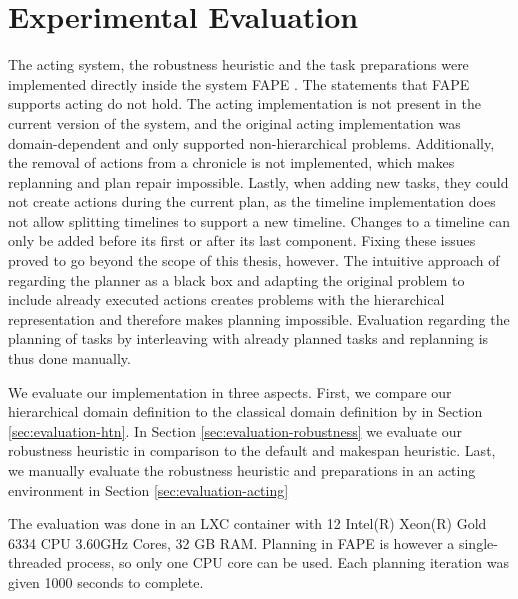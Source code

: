 \section{Experimental Evaluation}\label{sec:evaluation}

The acting system, the robustness heuristic and the task preparations were implemented directly inside the system \ac{FAPE} \citep{bit-monnotTemporalHierarchicalModels2016a}.
The statements that \ac{FAPE} supports acting \citep{dvorakPlanningActingTemporal2014,bit-monnotTemporalHierarchicalModels2016a,bit-monnotFAPEConstraintbasedPlanner2020} do not hold.
The acting implementation is not present in the current version of the system, and the original acting implementation was domain-dependent and only supported non-hierarchical problems.
Additionally, the removal of actions from a chronicle is not implemented, which makes replanning and plan repair impossible.
Lastly, when adding new tasks, they could not create actions during the current plan, as the timeline implementation does not allow splitting timelines to support a new timeline.
Changes to a timeline can only be added before its first or after its last component.
Fixing these issues proved to go beyond the scope of this thesis, however.
The intuitive approach of regarding the planner as a black box and adapting the original problem to include already executed actions creates problems with the hierarchical representation and therefore makes planning impossible.
Evaluation regarding the planning of tasks by interleaving with already planned tasks and replanning is thus done manually.


We evaluate our implementation in three aspects.
First, we compare our hierarchical domain definition to the classical domain definition by \cite{yuxinliuPlanningOvercookedGame2020} in Section \ref{sec:evaluation-htn}.
In Section \ref{sec:evaluation-robustness} we evaluate our robustness heuristic in comparison to the default and makespan heuristic.
Last, we manually evaluate the robustness heuristic and preparations in an acting environment in Section \ref{sec:evaluation-acting}

The evaluation was done in an LXC container with 12 Intel(R) Xeon(R) Gold 6334 CPU 3.60GHz Cores, 32 GB RAM.
Planning in \ac{FAPE} is however a single-threaded process, so only one CPU core can be used.
Each planning iteration was given 1000 seconds to complete.

